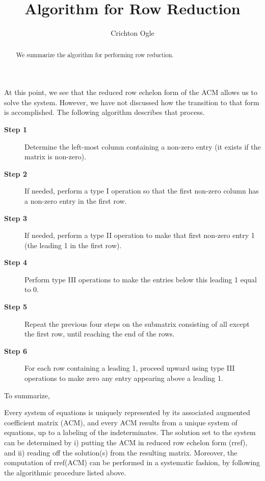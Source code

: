 \documentclass{ximera}
\author{Crichton Ogle}
\title{Algorithm for Row Reduction}
\begin{document}
\begin{abstract}
  We summarize the algorithm for performing row reduction.
\end{abstract}
\maketitle

At this point, we see that the reduced row echelon form of the ACM
allows us to solve the system. However, we have not discussed how the
transition to that form is accomplished. The following algorithm
describes that process.

\begin{description}
\item[{\bf Step 1}] Determine the left-most column containing a non-zero entry (it exists if the matrix is non-zero).
\item[{\bf Step 2}] If needed, perform a type I operation so that the first non-zero column has a non-zero entry in the first row.
\item[{\bf Step 3}] If needed, perform a type II operation to make that first non-zero entry 1 (the leading 1 in the first row).
\item[{\bf Step 4}] Perform type III operations to make the entries below this leading 1 equal to 0.
\item[{\bf Step 5}] Repeat the previous four steps on the submatrix consisting of all except the first row, until reaching the end of the rows.
\item[{\bf Step 6}] For each row containing a leading 1, proceed upward using type III operations to  make zero any entry appearing above a leading 1.
\end{description}

To summarize,

\begin{theorem} Every system of equations is uniquely represented by
  its associated augmented coefficient matrix (ACM), and every ACM
  results from a unique system of equations, up to a labeling of the
  indeterminates. The solution set to the system can be determined by
  i) putting the ACM in reduced row echelon form (rref), and ii)
  reading off the solution(s) from the resulting matrix. Moreover, the
  computation of rref(ACM) can be performed in a systematic fashion,
  by following the algorithmic procedure listed above.
\end{theorem}
\end{document}
